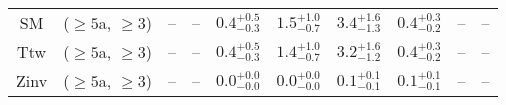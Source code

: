 \begin{table}[h!]
{\begin{tabular}{cccccccccc}
	SM & ($\ge5$a, $\ge3$) & -- & -- & $0.4^{+ 0.5 }_{- 0.3 }$ & $1.5^{+ 1.0 }_{- 0.7 }$ & $3.4^{+ 1.6 }_{- 1.3 }$ & $0.4^{+ 0.3 }_{- 0.2 }$ & -- & -- \\[0.5ex] 
	Ttw & ($\ge5$a, $\ge3$) & -- & -- & $0.4^{+ 0.5 }_{- 0.3 }$ & $1.4^{+ 1.0 }_{- 0.7 }$ & $3.2^{+ 1.6 }_{- 1.2 }$ & $0.4^{+ 0.3 }_{- 0.2 }$ & -- & -- \\[0.5ex] 
	Zinv & ($\ge5$a, $\ge3$) & -- & -- & $0.0^{+ 0.0 }_{- 0.0 }$ & $0.0^{+ 0.0 }_{- 0.0 }$ & $0.1^{+ 0.1 }_{- 0.1 }$ & $0.1^{+ 0.1 }_{- 0.1 }$ & -- & -- \\[0.5ex] 
	\hline
	\hline
\end{tabular}}
\end{table}
